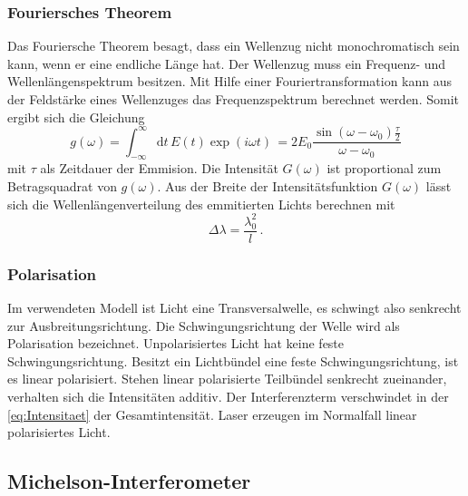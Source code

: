 \subsubsection{Fouriersches Theorem} %
\label{sec:Fouriersches Theorem}

Das Fouriersche Theorem besagt, dass ein Wellenzug nicht monochromatisch sein kann, wenn er eine endliche Länge hat.
Der Wellenzug muss ein Frequenz- und Wellenlängenspektrum besitzen.
Mit Hilfe einer Fouriertransformation kann aus der Feldstärke eines Wellenzuges das Frequenzspektrum berechnet werden.
Somit ergibt sich die Gleichung
\begin{equation*}
    g\left(ω\right) = \int_{-\infty}^{\infty}\text{d}t\, E\left(t\right) \exp{\left(iωt\right)}\,
    = 2 E_0 \frac{\sin{(ω - ω_0)}\frac{τ}{2}}{ω - ω_0}
\end{equation*}
mit $τ$ als Zeitdauer der Emmision.
Die Intensität $G(ω)$ ist proportional zum Betragsquadrat von $g(ω)$.
Aus der Breite der Intensitätsfunktion $G(ω)$ lässt sich die Wellenlängenverteilung des emmitierten Lichts berechnen mit
\begin{equation*}
    Δλ = \frac{λ_0^2}{l}\, .
\end{equation*}

\subsubsection{Polarisation}
\label{sec:Polarisation}

Im verwendeten Modell ist Licht eine Transversalwelle, es schwingt also senkrecht zur Ausbreitungsrichtung.
Die Schwingungsrichtung der Welle wird als Polarisation bezeichnet.
Unpolarisiertes Licht hat keine feste Schwingungsrichtung.
Besitzt ein Lichtbündel eine feste Schwingungsrichtung, ist es linear polarisiert.
Stehen linear polarisierte Teilbündel senkrecht zueinander, 
verhalten sich die Intensitäten additiv.
Der Interferenzterm verschwindet in der \autoref{eq:Intensitaet} der Gesamtintensität.
Laser erzeugen im Normalfall linear polarisiertes Licht.


\subsection{Michelson-Interferometer}
\label{sec:Michelson-Interferometer}

